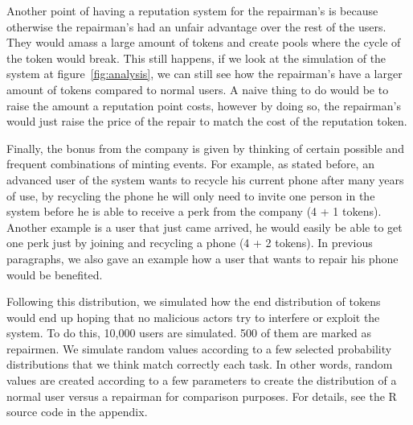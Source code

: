 \documentclass[11pt]{scrartcl}
\begin{document}
Another point of having a reputation system for the repairman's is because otherwise the repairman's had an unfair advantage over the rest of the users. They would amass a large amount of tokens and create pools where the cycle of the token would break. This still happens, if we look at the simulation of the system at figure~\ref{fig:analysis}, we can still see how the repairman's have a larger amount of tokens compared to normal users. A naive thing to do would be to raise the amount a reputation point costs, however by doing so, the repairman's would just raise the price of the repair to match the cost of the reputation token.

Finally, the bonus from the company is given by thinking of certain possible and frequent combinations of minting events. For example, as stated before, an advanced user of the system wants to recycle his current phone after many years of use, by recycling the phone he will only need to invite one person in the system before he is able to receive a perk from the company (4 + 1 tokens). Another example is a user that just came arrived, he would easily be able to get one perk just by joining and recycling a phone (4 + 2 tokens). In previous paragraphs, we also gave an example how a user that wants to repair his phone would be benefited.

Following this distribution, we simulated how the end distribution of tokens would end up hoping that no malicious actors try to interfere or exploit the system. To do this, 10,000 users are simulated. 500 of them are marked as repairmen. We simulate random values according to a few selected probability distributions that we think match correctly each task. In other words, random values are created according to a few parameters to create the distribution of a normal user versus a repairman for comparison purposes. For details, see the R source code in the appendix.
\end{document}
